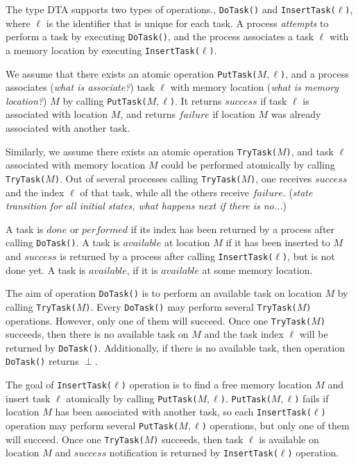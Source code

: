 The type DTA supports two types of operations., \texttt{DoTask()} and
\texttt{InsertTask(}$\ell$\texttt{)}, where $\ell$ is the identifier that is unique for each task.
A process \emph{attempts} to perform a task by executing \texttt{DoTask()}, and the process associates
a task $\ell$ with a memory location by executing \texttt{InsertTask(}$\ell$\texttt{)}.

We assume that there exists an atomic operation \texttt{PutTask(}$M,\ell$\texttt{)},
and a process associates (\emph{what is associate?}) task $\ell$ with memory location (\emph{what is memory location?}) $M$
by calling \texttt{PutTask(}$M,\ell$\texttt{)}.
It returns $success$ if task $\ell$ is associated with location $M$, and returns $failure$ if location $M$ was
already associated with another task.

Similarly, we assume there exists an atomic operation \texttt{TryTask(}$M$\texttt{)}, and
task $\ell$ associated with memory location $M$ could be performed atomically by calling \texttt{TryTask(}$M$\texttt{)}.
Out of several processes calling \texttt{TryTask(}$M$\texttt{)}, one receives $success$ and the index $\ell$ of
that task, while all the others receive $failure$. (\emph{state transition for all initial states, what happens
next if there is no...})

A task is $done$ or $performed$ if its index has been returned by a process after calling \texttt{DoTask()}.
A task is $available$ at location $M$ if it has been inserted to $M$ and $success$ is returned by a process
after calling \texttt{InsertTask(}$\ell$\texttt{)}, but is not done yet. A task is $available$, if it is $available$
at some memory location.

The aim of operation \texttt{DoTask()} is to perform an available task on location $M$ by calling
\texttt{TryTask(}$M$\texttt{)}. Every \texttt{DoTask()} may perform several \texttt{TryTask(}$M$\texttt{)}
operations. However, only one of them will succeed. Once one \texttt{TryTask(}$M$\texttt{)} succeeds, then
there is no available task on $M$ and the task index $\ell$ will be returned by \texttt{DoTask()}. Additionally,
if there is no available task, then operation \texttt{DoTask()} returns $\perp$.

The goal of \texttt{InsertTask(}$\ell$\texttt{)} operation is to find a free memory location $M$ and insert
task $\ell$ atomically by calling \texttt{PutTask(}$M,\ell$\texttt{)}. \texttt{PutTask(}$M,\ell$\texttt{)}
fails if location $M$ has been associated with another task, so each \texttt{InsertTask(}$\ell$\texttt{)}
operation may perform several \texttt{PutTask(}$M,\ell$\texttt{)} operations, but only one of them will succeed.
Once one \texttt{TryTask(}$M$\texttt{)} succeeds, then task $\ell$ is available on location $M$ and $success$
notification is returned by \texttt{InsertTask(}$\ell$\texttt{)} operation.

